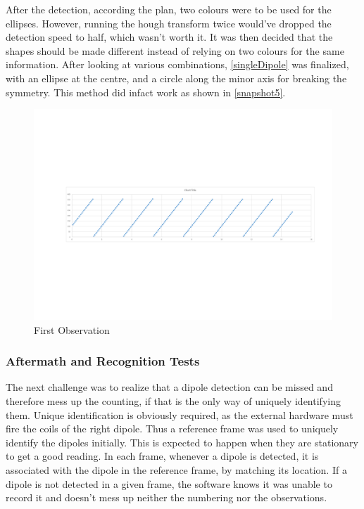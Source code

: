 			After the detection, according the plan, two colours were to be used for the ellipses. However, running the hough transform twice would've dropped the detection speed to half, which wasn't worth it. It was then decided that the shapes should be made different instead of relying on two colours for the same information. After looking at various combinations, \autoref{singleDipole} was finalized, with an ellipse at the centre, and a circle along the minor axis for breaking the symmetry. This method did infact work as shown in \autoref{snapshot5}.
			\par

			\begin{figure}[bth]
				\begin{center}
					\includegraphics[width=1.1\linewidth]{gfx/testGraphs}
				\end{center}
			\caption[First Observation]{First Observation}
			\label{testGraphs}
			\end{figure}
		\subsubsection{Aftermath and Recognition Tests}
			The next challenge was to realize that a dipole detection can be missed and therefore mess up the counting, if that is the only way of uniquely identifying them. Unique identification is obviously required, as the external hardware must fire the coils of the right dipole. Thus a reference frame was used to uniquely identify the dipoles initially. This is expected to happen when they are stationary to get a good reading. In each frame, whenever a dipole is detected, it is associated with the dipole in the reference frame, by matching its location. If a dipole is not detected in a given frame, the software knows it was unable to record it and doesn't mess up neither the numbering nor the observations.
			\par

